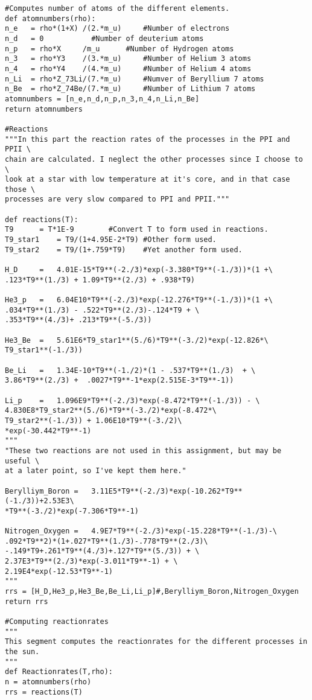 \documentclass[a4paper,12pt]{article}
\begin{document}
\begin{verbatim}
#Computes number of atoms of the different elements.
def atomnumbers(rho):
n_e   = rho*(1+X) /(2.*m_u)    	#Number of electrons
n_d   = 0			#Number of deuterium atoms
n_p   = rho*X	  /m_u     	#Number of Hydrogen atoms
n_3   = rho*Y3	  /(3.*m_u)     #Number of Helium 3 atoms
n_4   = rho*Y4	  /(4.*m_u)     #Number of Helium 4 atoms
n_Li  = rho*Z_73Li/(7.*m_u) 	#Numver of Beryllium 7 atoms
n_Be  = rho*Z_74Be/(7.*m_u) 	#Number of Lithium 7 atoms
atomnumbers = [n_e,n_d,n_p,n_3,n_4,n_Li,n_Be]
return atomnumbers

#Reactions
"""In this part the reaction rates of the processes in the PPI and PPII \
chain are calculated. I neglect the other processes since I choose to \
look at a star with low temperature at it's core, and in that case those \
processes are very slow compared to PPI and PPII."""

def reactions(T):
T9 		= T*1E-9		#Convert T to form used in reactions.
T9_star1 	= T9/(1+4.95E-2*T9)	#Other form used.
T9_star2 	= T9/(1+.759*T9)	#Yet another form used.

H_D   	= 	4.01E-15*T9**(-2./3)*exp(-3.380*T9**(-1./3))*(1 +\
.123*T9**(1./3) + 1.09*T9**(2./3) + .938*T9)

He3_p	= 	6.04E10*T9**(-2./3)*exp(-12.276*T9**(-1./3))*(1 +\
.034*T9**(1./3) - .522*T9**(2./3)-.124*T9 + \
.353*T9**(4./3)+ .213*T9**(-5./3))

He3_Be  = 	5.61E6*T9_star1**(5./6)*T9**(-3./2)*exp(-12.826*\
T9_star1**(-1./3))

Be_Li   = 	1.34E-10*T9**(-1./2)*(1 - .537*T9**(1./3)  + \
3.86*T9**(2./3) +  .0027*T9**-1*exp(2.515E-3*T9**-1))

Li_p	= 	1.096E9*T9**(-2./3)*exp(-8.472*T9**(-1./3)) - \
4.830E8*T9_star2**(5./6)*T9**(-3./2)*exp(-8.472*\
T9_star2**(-1./3)) + 1.06E10*T9**(-3./2)\
*exp(-30.442*T9**-1)
"""
"These two reactions are not used in this assignment, but may be useful \
at a later point, so I've kept them here."

Berylliym_Boron = 	3.11E5*T9**(-2./3)*exp(-10.262*T9**(-1./3))+2.53E3\
*T9**(-3./2)*exp(-7.306*T9**-1)

Nitrogen_Oxygen = 	4.9E7*T9**(-2./3)*exp(-15.228*T9**(-1./3)-\
.092*T9**2)*(1+.027*T9**(1./3)-.778*T9**(2./3)\
-.149*T9+.261*T9**(4./3)+.127*T9**(5./3)) + \
2.37E3*T9**(2./3)*exp(-3.011*T9**-1) + \
2.19E4*exp(-12.53*T9**-1)
"""
rrs = [H_D,He3_p,He3_Be,Be_Li,Li_p]#,Berylliym_Boron,Nitrogen_Oxygen
return rrs

#Computing reactionrates
"""
This segment computes the reactionrates for the different processes in the sun.
"""
def Reactionrates(T,rho):
n = atomnumbers(rho)
rrs = reactions(T)


\end{verbatim}
\end{document}
